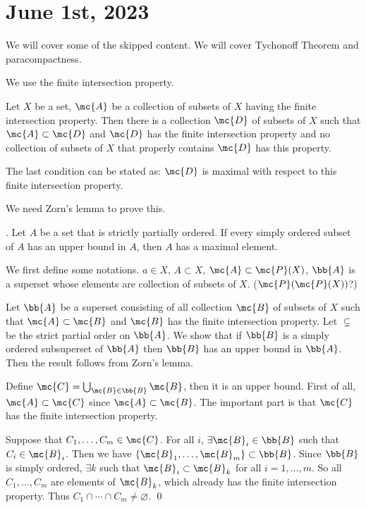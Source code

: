 \section*{June 1st, 2023}

We will cover some of the skipped content. We will cover Tychonoff Theorem and paracompactness.

\setcounter{topic}{36}

We use the finite intersection property.

 Let \(X\) be a set, \(\mc{A}\) be a collection of subsets of \(X\) having the finite intersection property. Then there is a collection \(\mc{D}\) of subsets of \(X\) such that \(\mc{A} \subset \mc{D}\) and \(\mc{D}\) has the finite intersection property and no collection of subsets of \(X\) that properly contains \(\mc{D}\) has this property.

\rmk The last condition can be stated as: \(\mc{D}\) is maximal with respect to this finite intersection property.

We need Zorn's lemma to prove this.

\lemma.  Let \(A\) be a set that is strictly partially ordered. If every simply ordered subset of \(A\) has an upper bound in \(A\), then \(A\) has a maximal element.

\pf We first define some notations. \(a \in X\), \(A \subset X\), \(\mc{A} \subset \mc{P}(X)\), \(\bb{A}\) is a superset whose elements are collection of subsets of \(X\). (\(\mc{P}(\mc{P}(X))\)?)

Let \(\bb{A}\) be a superset consisting of all collection \(\mc{B}\) of subsets of \(X\) such that \(\mc{A} \subset \mc{B}\) and \(\mc{B}\) has the finite intersection property. Let \(\subsetneq\) be the strict partial order on \(\bb{A}\). We show that if \(\bb{B}\) is a simply ordered subsuperset of \(\bb{A}\) then \(\bb{B}\) has an upper bound in \(\bb{A}\). Then the result follows from Zorn's lemma.

Define \(\mc{C} = \bigcup_{\mc{B} \in \bb{B}} \mc{B}\), then it is an upper bound. First of all, \(\mc{A} \subset \mc{C}\) since \(\mc{A} \subset \mc{B}\). The important part is that \(\mc{C}\) has the finite intersection property.

Suppose that \(C_1, \dots, C_m \in \mc{C}\). For all \(i\), \(\exists \mc{B}_i \in \bb{B}\) such that \(C_i \in \mc{B}_i\). Then we have \(\{\mc{B}_1, \dots, \mc{B}_m\} \\\subset \bb{B}\). Since \(\bb{B}\) is simply ordered, \(\exists k\) such that \(\mc{B}_i \subset \mc{B}_k\) for all \(i = 1, \dots, m\). So all \(C_1, \dots, C_m\) are elements of \(\mc{B}_k\), which already has the finite intersection property. Thus \(C_1 \cap \cdots \cap C_m \neq \varnothing\). \qed


